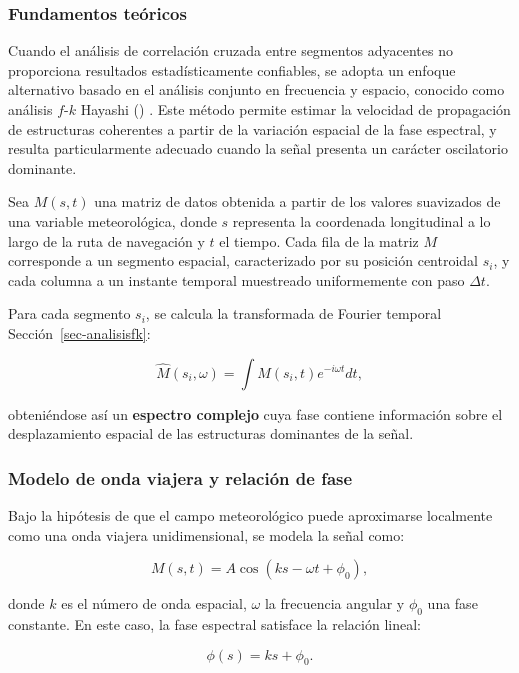 \documentclass[
  spanish,
  us-letterpaper,
]{scrreprt}
\numberwithin{equation}{section}
\begin{document}
\subsubsection{Fundamentos teóricos}\label{fundamentos-teuxf3ricos}

Cuando el análisis de correlación cruzada entre segmentos adyacentes no
proporciona resultados estadísticamente confiables, se adopta un enfoque
alternativo basado en el análisis conjunto en frecuencia y espacio,
conocido como análisis \(f\)-\(k\) Hayashi
() . Este método permite estimar
la velocidad de propagación de estructuras coherentes a partir de la
variación espacial de la fase espectral, y resulta particularmente
adecuado cuando la señal presenta un carácter oscilatorio dominante.

Sea \(M(s,t)\) una matriz de datos obtenida a partir de los valores
suavizados de una variable meteorológica, donde \(s\) representa la
coordenada longitudinal a lo largo de la ruta de navegación y \(t\) el
tiempo. Cada fila de la matriz \(M\) corresponde a un segmento espacial,
caracterizado por su posición centroidal \(s_i\), y cada columna a un
instante temporal muestreado uniformemente con paso \(\Delta t\).

Para cada segmento \(s_i\), se calcula la transformada de Fourier
temporal Sección~\ref{sec-analisisfk}:

\[
\hat{M}(s_i,\omega) = \int M(s_i,t) e^{-i\omega t} dt,
\]

obteniéndose así un \textbf{espectro complejo} cuya fase contiene
información sobre el desplazamiento espacial de las estructuras
dominantes de la señal.

\subsubsection{Modelo de onda viajera y relación de
fase}\label{modelo-de-onda-viajera-y-relaciuxf3n-de-fase-1}

Bajo la hipótesis de que el campo meteorológico puede aproximarse
localmente como una onda viajera unidimensional, se modela la señal
como:

\[
M(s,t) = A \cos(ks - \omega t + \phi_0),
\]

donde \(k\) es el número de onda espacial, \(\omega\) la frecuencia
angular y \(\phi_0\) una fase constante. En este caso, la fase espectral
satisface la relación lineal:

\[
\phi(s) = ks + \phi_0.
\]
\end{document}
